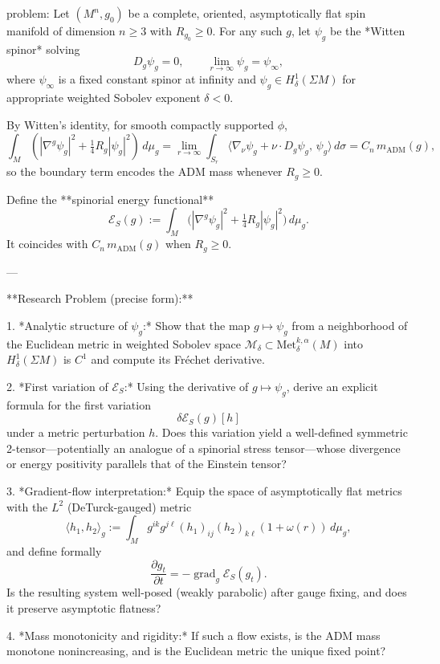 problem:  
Let \((M^n,g_0)\) be a complete, oriented, asymptotically flat spin manifold of dimension \(n\ge 3\) with \(R_{g_0}\ge 0\).  
For any such \(g\), let \(\psi_g\) be the *Witten spinor* solving  
\[
D_g \psi_g = 0,\qquad \lim_{r\to \infty}\psi_g = \psi_\infty,
\]
where \(\psi_\infty\) is a fixed constant spinor at infinity and \(\psi_g\in H^1_\delta(\Sigma M)\) for appropriate weighted Sobolev exponent \(\delta<0\).  

By Witten’s identity, for smooth compactly supported \( \phi\),
\[
\int_M (|\nabla^g \psi_g|^2 + \tfrac14 R_g |\psi_g|^2)\, d\mu_g
  = \lim_{r\to\infty} \int_{S_r} \langle \nabla_\nu \psi_g + \nu\!\cdot\! D_g \psi_g,\, \psi_g\rangle \, d\sigma
  = C_n\, m_{\mathrm{ADM}}(g),
\]
so the boundary term encodes the ADM mass whenever \(R_g\ge 0\).  

Define the **spinorial energy functional**
\[
\mathcal{E}_S(g) := \int_M \!\big(|\nabla^g \psi_g|^2 + \tfrac14 R_g |\psi_g|^2\big)\, d\mu_g.
\]
It coincides with \(C_n\, m_{\mathrm{ADM}}(g)\) when \(R_g\ge 0\).

---

**Research Problem (precise form):**  

1. *Analytic structure of \(\psi_g\):*  
Show that the map \(g\mapsto \psi_g\) from a neighborhood of the Euclidean metric in weighted Sobolev space \( \mathcal{M}_\delta \subset \mathrm{Met}^{k,\alpha}_\delta(M)\) into \(H^1_\delta(\Sigma M)\) is \(C^1\) and compute its Fréchet derivative.  

2. *First variation of \(\mathcal{E}_S\):*  
Using the derivative of \(g \mapsto \psi_g\), derive an explicit formula for the first variation  
\[
\delta \mathcal{E}_S(g)[h]
\]
under a metric perturbation \(h\). Does this variation yield a well-defined symmetric 2-tensor—potentially an analogue of a spinorial stress tensor—whose divergence or energy positivity parallels that of the Einstein tensor?  

3. *Gradient-flow interpretation:*  
Equip the space of asymptotically flat metrics with the \(L^2\) (DeTurck-gauged) metric  
\[
\langle h_1,h_2\rangle_g := \int_M g^{ik}g^{j\ell} (h_1)_{ij} (h_2)_{k\ell} (1+\omega(r))\, d\mu_g,
\]
and define formally  
\[
\frac{\partial g_t}{\partial t} = -\operatorname{grad}_g \mathcal{E}_S(g_t).
\]
Is the resulting system well-posed (weakly parabolic) after gauge fixing, and does it preserve asymptotic flatness?  

4. *Mass monotonicity and rigidity:*  
If such a flow exists, is the ADM mass monotone nonincreasing, and is the Euclidean metric the unique fixed point?  


